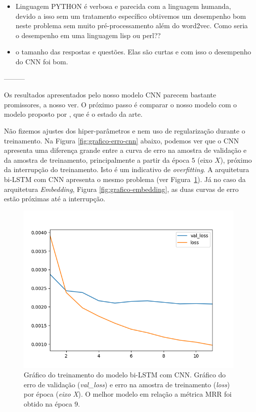 \begin{itemize}
    \item Linguagem PYTHON é verbosa e parecida com a linguagem humanda, devido a isso sem um tratamento específico obtivemos um desempenho bom neste problema sem muito pré-processamento além do word2vec. Como seria o desempenho em uma linguagem lisp ou perl??
    \item o tamanho das respostas e questões. Elas são curtas e com isso o desempenho do CNN foi bom. 
\end{itemize}




---------

Os resultados apresentados pelo nosso modelo CNN parecem bastante promissores, a nosso ver. O próximo passo é comparar o nosso modelo com o modelo proposto por \cite{cambronero-deep-learning-code-search:2019}, que é o estado da arte. 

Não fizemos ajustes dos hiper-parâmetros e nem uso de regularização durante o treinamento. Na Figura \ref{fig:grafico-erro-cnn} abaixo, podemos ver que o CNN apresenta uma diferença grande entre a curva de erro na amostra de validação e da amostra de treinamento, principalmente a partir da época $5$ (eixo $X$), próximo da interrupção do treinamento. Isto é um indicativo de \textit{overfitting}. A arquitetura bi-LSTM com CNN apresenta o mesmo problema (ver Figura~\ref{fig:grafico-erro-bi-lstm-cnn}). Já no caso da arquitetura \textit{Embedding}, Figura \ref{fig:grafico-embedding}, as duas curvas de erro estão próximas até a interrupção. 

\begin{figure}[h]
    \centering
    \includegraphics[width=1\textwidth]{figuras/cap-resultados-preliminares/569229_ConvolutionalLSTM_plot.png}
    \caption{Gráfico do treinamento do modelo bi-LSTM com CNN. Gráfico do erro de validação (\emph{val\_loss}) e erro na amostra de treinamento (\emph{loss}) por época (\emph{eixo X}). O melhor modelo em relação a métrica MRR foi obtido na época $9$.}
    \label{fig:grafico-erro-bi-lstm-cnn}
\end{figure}

